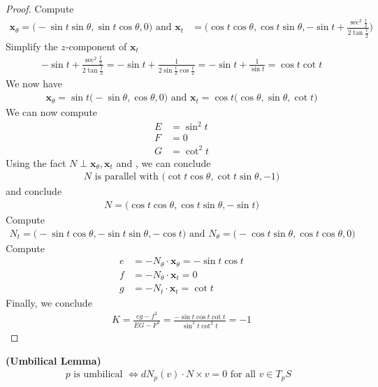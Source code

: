 \documentclass{report}
\begin{document}
\begin{proof}
Compute 
 \begin{align*}
\textbf{x}_\theta= \Big(-\sin t \sin \theta, \sin t \cos \theta , 0 \Big)\text{ and }\textbf{x}_t &= \Big(\cos t \cos \theta , \cos t \sin \theta ,- \sin t + \frac{\sec^2 \frac{t}{2}}{2 \tan \frac{t}{2}}  \Big)
\end{align*}
Simplify the $z$-component of  $\textbf{x}_t$
\begin{align}
\label{simp1}
 -\sin t + \frac{\sec^2 \frac{t}{2}}{2 \tan \frac{t}{2}}= - \sin t +\frac{1}{2 \sin \frac{t}{2}\cos \frac{t}{2}}= -\sin t + \frac{1}{\sin t}= \cos t \cot t 
\end{align}
We now have 
\begin{align*}
\textbf{x}_\theta = \sin t \Big(-\sin \theta, \cos \theta ,0 \Big)\text{ and }\textbf{x}_t = \cos t \Big(\cos \theta, \sin \theta, \cot t \Big)
\end{align*}
We can now compute
\begin{align*}
E&= \sin^2 t\\
F&= 0 \\
G&= \cot^2 t
\end{align*}
Using the fact $N\perp \textbf{x}_\theta, \textbf{x}_t$ and , we can conclude 
\begin{align*}
N\text{ is parallel with }\Big(\cot t \cos \theta , \cot t \sin \theta, -1 \Big)
\end{align*}
and conclude 
\begin{align*}
N=\Big(\cos t \cos \theta, \cos t \sin \theta, -\sin t \Big)
\end{align*}
Compute 
\begin{align*}
N_t=\Big(- \sin t \cos \theta, -\sin t \sin \theta, -\cos t \Big)\text{ and }N_\theta = \Big(-\cos t \sin \theta, \cos t \cos \theta, 0 \Big)
\end{align*}
Compute 
\begin{align*}
e&=-N_\theta \cdot \textbf{x}_\theta = -\sin t \cos t\\
f&=-N_\theta \cdot \textbf{x}_t= 0\\
g&=-N_t \cdot \textbf{x}_t= \cot t
\end{align*}
Finally, we conclude 
\begin{align*}
K=\frac{eg-f^2}{EG-F^2}=\frac{-\sin t \cos t \cot t}{\sin^2 t \cot^2 t  }=-1
\end{align*}



\end{proof}
\begin{lemma}
\label{UL}
\textbf{(Umbilical Lemma)} 
\begin{align*}
p\text{ is umbilical }\iff  dN_p(v)\cdot N \times v=0\text{ for all $v \in T_pS$ }
\end{align*}
\end{lemma}
\end{document}

